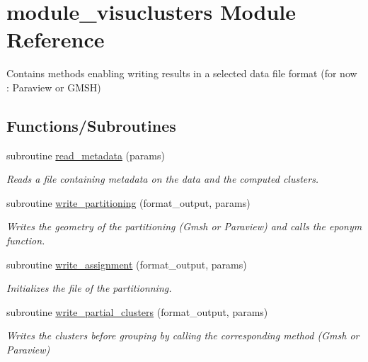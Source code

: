 \hypertarget{namespacemodule__visuclusters}{}\section{module\+\_\+visuclusters Module Reference}
\label{namespacemodule__visuclusters}


Contains methods enabling writing results in a selected data file format (for now \+: Paraview or G\+M\+S\+H)  


\subsection*{Functions/\+Subroutines}
\begin{DoxyCompactItemize}
\item 
subroutine \hyperlink{namespacemodule__visuclusters_ab68939a34024c66e1e7cc64a0dcf8736}{read\+\_\+metadata} (params)
\begin{DoxyCompactList}\small\item\em Reads a file containing metadata on the data and the computed clusters. \end{DoxyCompactList}\item 
subroutine \hyperlink{namespacemodule__visuclusters_adae3f4360febb54cb901ce9f591d8656}{write\+\_\+partitioning} (format\+\_\+output, params)
\begin{DoxyCompactList}\small\item\em Writes the geometry of the partitioning (Gmsh or Paraview) and calls the eponym function. \end{DoxyCompactList}\item 
subroutine \hyperlink{namespacemodule__visuclusters_a11320cacc6eae8f372b75e9ec61b38b6}{write\+\_\+assignment} (format\+\_\+output, params)
\begin{DoxyCompactList}\small\item\em Initializes the file of the partitionning. \end{DoxyCompactList}\item 
subroutine \hyperlink{namespacemodule__visuclusters_a426807700ec2991178bd989694a2ff17}{write\+\_\+partial\+\_\+clusters} (format\+\_\+output, params)
\begin{DoxyCompactList}\small\item\em Writes the clusters before grouping by calling the corresponding method (Gmsh or Paraview) \end{DoxyCompactList}\item 

\end{DoxyCompactItemize}

